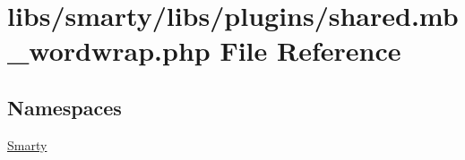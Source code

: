 \hypertarget{shared_8mb__wordwrap_8php}{}\section{libs/smarty/libs/plugins/shared.mb\+\_\+wordwrap.\+php File Reference}
\label{shared_8mb__wordwrap_8php}
\subsection*{Namespaces}
\begin{DoxyCompactItemize}
\item 
 \hyperlink{namespace_smarty}{Smarty}
\end{DoxyCompactItemize}
